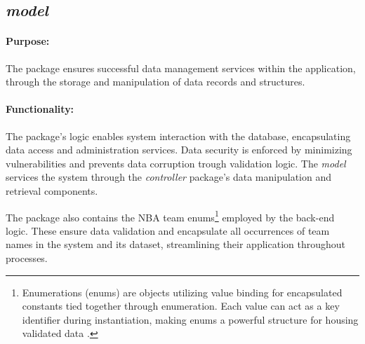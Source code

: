 \documentclass{thesis-ekf}
\theoremstyle{definition}
\theoremstyle{remark}
\begin{document}
\subsection{\emph{model}}
\paragraph{Purpose:}
The package ensures successful data management services within the application, through the storage and manipulation of data records and structures. 
\paragraph{Functionality:}
The package's logic enables system interaction with the database, encapsulating data access and administration services. Data security is enforced by minimizing vulnerabilities and prevents data corruption trough validation logic. The \emph{model} services the system through the \emph{controller} package's data manipulation and retrieval components.

The package also contains the NBA team enums\footnote{Enumerations (enums) are objects utilizing value binding for encapsulated constants tied together through enumeration. Each value can act as a key identifier during instantiation, making enums a powerful structure for housing validated data \cite{enum}.} employed by the back-end logic. These ensure data validation and encapsulate all occurrences of team names in the system and its dataset, streamlining their application throughout processes.
\end{document}
